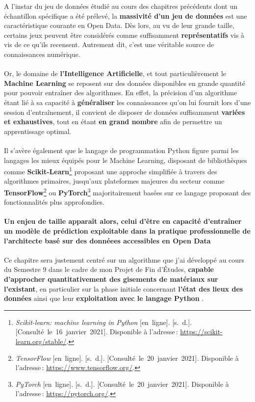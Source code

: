 \documentclass[
  11pt,
  french,
]{article}
\begin{document}
A l'instar du jeu de données étudié au cours des chapitres précédents
dont un échantillon spécifique a été prélevé, la \textbf{massivité d'un
jeu de données} est une caractéristique courante en Open Data. Dès lors,
au vu de leur grande taille, certains jeux peuvent être considérés comme
suffisamment \textbf{représentatifs} vis à vis de ce qu'ils recensent.
Autrement dit, c'est une véritable source de connaissances numérique.\\
~\\
Or, le domaine de \textbf{l'Intelligence Artificielle}, et tout
particulièrement le \textbf{Machine Learning} se reposent sur des
données disponibles en grande quantité pour pouvoir entraîner des
algorithmes. En effet, la précision d'un algorithme étant lié à sa
capacité à \textbf{généraliser} les connaissances qu'on lui fournit lors
d'une session d'entraînement, il convient de disposer de données
suffisamment \textbf{variées et exhaustives}, tout en étant \textbf{en
grand nombre} afin de permettre un apprentissage optimal.\\
~\\
Il s'avère également que le langage de programmation Python figure parmi
les langages les mieux équipés pour le Machine Learning, disposant de
bibliothèques comme \textbf{Scikit-Learn}\footnote{\emph{Scikit-learn:
  machine learning in Python} {[}en~ligne{]}. {[}s.~d.{]}.
  {[}Consulté~le~16~janvier~2021{]}. Disponible à l'adresse\,:
  \url{https://scikit-learn.org/stable/}.} proposant une approche
simplifiée à travers des algorithmes primaires, jusqu'aux plateformes
majeures du secteur comme \textbf{TensorFlow}\footnote{\emph{TensorFlow}
  {[}en~ligne{]}. {[}s.~d.{]}. {[}Consulté~le~20~janvier~2021{]}.
  Disponible à l'adresse\,: \url{https://www.tensorflow.org/}.} ou
\textbf{PyTorch}\footnote{\emph{PyTorch} {[}en~ligne{]}. {[}s.~d.{]}.
  {[}Consulté~le~20~janvier~2021{]}. Disponible à l'adresse\,:
  \url{https://pytorch.org/}.} majoritairement basées sur ce langage
proposant des fonctionnalités plus approfondies.\\
~\\
\textbf{Un enjeu de taille apparaît alors, celui d'être en capacité
d'entraîner un modèle de prédiction exploitable dans la pratique
professionnelle de l'architecte basé sur des donnéees accessibles en
Open Data}\\
~\\
Ce chapitre sera justement centré sur un algorithme que j'ai développé
au cours du Semestre 9 dans le cadre de mon Projet de Fin d'Études,
\textbf{capable d'approcher quantitativement des gisements de matériaux
sur l'existant}, en particulier sur la phase initiale concernant
\textbf{l'état des lieux des données} ainsi que leur
\textbf{exploitation avec le langage Python} .
\end{document}
